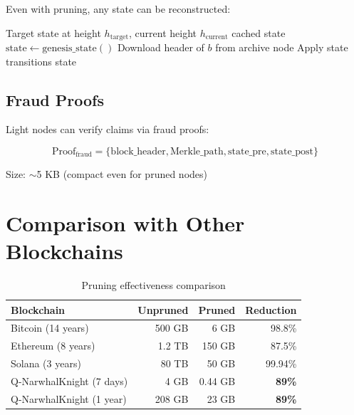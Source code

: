 \documentclass[11pt,a4paper]{article}
\begin{document}
Even with pruning, any state can be reconstructed:

\begin{algorithm}[H]
\caption{State Reconstruction}
\begin{algorithmic}
\REQUIRE Target state at height $h_{\text{target}}$, current height $h_{\text{current}}$
    \RETURN cached state 
\ELSE
    \STATE $\text{state} \leftarrow \text{genesis\_state}()$
        \STATE Download header of $b$ from archive node
        \STATE Apply state transitions
    \ENDFOR
    \RETURN state
\ENDIF
\end{algorithmic}
\end{algorithm}

\subsection{Fraud Proofs}

Light nodes can verify claims via fraud proofs:

\begin{equation}
\text{Proof}_{\text{fraud}} = \{\text{block\_header}, \text{Merkle\_path}, \text{state\_pre}, \text{state\_post}\}
\end{equation}

Size: $\sim$5 KB (compact even for pruned nodes)

\section{Comparison with Other Blockchains}

\begin{table}[h]
\centering
\begin{tabular}{lrrr}
\toprule
\textbf{Blockchain} & \textbf{Unpruned} & \textbf{Pruned} & \textbf{Reduction} \\
\midrule
Bitcoin (14 years) & 500 GB & 6 GB & 98.8\% \\
Ethereum (8 years) & 1.2 TB & 150 GB & 87.5\% \\
Solana (3 years) & 80 TB & 50 GB & 99.94\% \\
\midrule
Q-NarwhalKnight (7 days) & 4 GB & 0.44 GB & \textbf{89\%} \\
Q-NarwhalKnight (1 year) & 208 GB & 23 GB & \textbf{89\%} \\
\bottomrule
\end{tabular}
\caption{Pruning effectiveness comparison}
\end{table}
\end{document}
